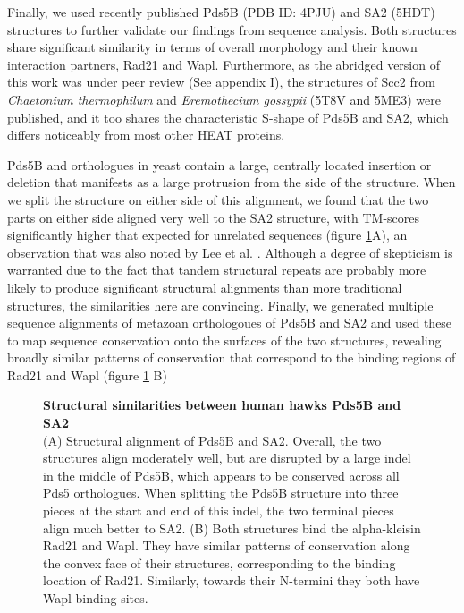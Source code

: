 \documentclass[a4paper,11pt,twoside,openright]{scrbook}
\begin{document}
Finally, we used recently published Pds5B \cite{Ouyang2016} (PDB ID: 4PJU) and SA2 \cite{Hara2014} (5HDT) structures to further validate our findings from sequence analysis. Both structures share significant similarity in terms of overall morphology and their known interaction partners, Rad21 and Wapl. Furthermore, as the abridged version of this work was under peer review \cite{Wells2017} (See appendix I), the structures of Scc2 from \textit{Chaetonium thermophilum} \cite{Kikuchi2016} and \textit{Eremothecium gossypii} \cite{Chao2017} (5T8V and 5ME3) were published, and it too shares the characteristic S-shape of Pds5B and SA2, which differs noticeably from most other HEAT proteins.

Pds5B and orthologues in yeast contain a large, centrally located insertion or deletion that manifests as a large protrusion from the side of the structure. When we split the structure on either side of this alignment, we found that the two parts on either side aligned very well to the SA2 structure, with TM-scores significantly higher that expected for unrelated sequences (figure \ref{figure:smcstruc}A), an observation that was also noted by Lee et al. \cite{Lee2016}. Although a degree of skepticism is warranted due to the fact that tandem structural repeats are probably more likely to produce significant structural alignments than more traditional structures, the similarities here are convincing. Finally, we generated multiple sequence alignments of metazoan orthologoues of Pds5B and SA2 and used these to map sequence conservation onto the surfaces of the two structures, revealing broadly similar patterns of conservation that correspond to the binding regions of Rad21 and Wapl (figure \ref{figure:smcstruc} B)

\begin{figure}[h]
    \caption[Structural similarities between human hawks Pds5B and SA2]{\sffamily \textbf{Structural similarities between human hawks Pds5B and SA2} \\ \small (A) Structural alignment of Pds5B and SA2. Overall, the two structures align moderately well, but are disrupted by a large indel in the middle of Pds5B, which appears to be conserved across all Pds5 orthologues. When splitting the Pds5B structure into three pieces at the start and end of this indel, the two terminal pieces align much better to SA2. (B) Both structures bind the alpha-kleisin Rad21 and Wapl. They have similar patterns of conservation along the convex face of their structures, corresponding to the binding location of Rad21. Similarly, towards their N-termini they both have Wapl binding sites.}
    \label{figure:smcstruc}
\end{figure}
\end{document}
